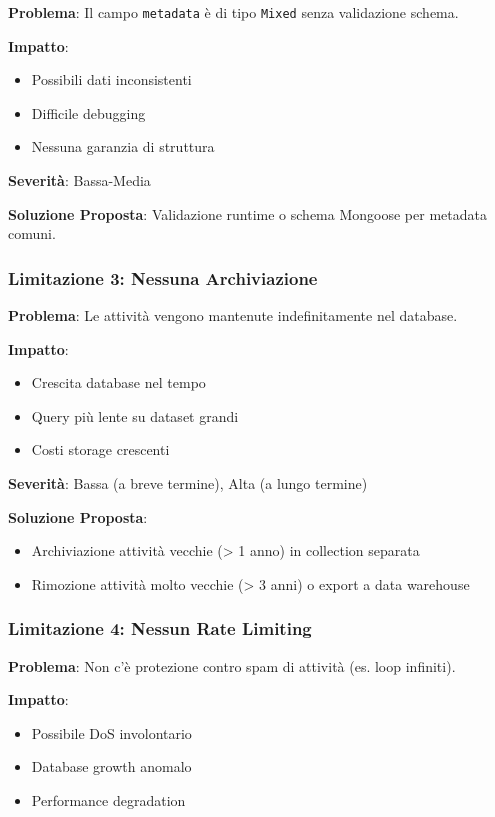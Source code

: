 \documentclass[11pt,a4paper]{article}
\begin{document}
\textbf{Problema}: Il campo \texttt{metadata} è di tipo \texttt{Mixed} senza validazione schema.

\textbf{Impatto}: 
\begin{itemize}
    \item Possibili dati inconsistenti
    \item Difficile debugging
    \item Nessuna garanzia di struttura
\end{itemize}

\textbf{Severità}: Bassa-Media

\textbf{Soluzione Proposta}: Validazione runtime o schema Mongoose per metadata comuni.

\subsubsection{Limitazione 3: Nessuna Archiviazione}

\textbf{Problema}: Le attività vengono mantenute indefinitamente nel database.

\textbf{Impatto}: 
\begin{itemize}
    \item Crescita database nel tempo
    \item Query più lente su dataset grandi
    \item Costi storage crescenti
\end{itemize}

\textbf{Severità}: Bassa (a breve termine), Alta (a lungo termine)

\textbf{Soluzione Proposta}: 
\begin{itemize}
    \item Archiviazione attività vecchie (> 1 anno) in collection separata
    \item Rimozione attività molto vecchie (> 3 anni) o export a data warehouse
\end{itemize}

\subsubsection{Limitazione 4: Nessun Rate Limiting}

\textbf{Problema}: Non c'è protezione contro spam di attività (es. loop infiniti).

\textbf{Impatto}: 
\begin{itemize}
    \item Possibile DoS involontario
    \item Database growth anomalo
    \item Performance degradation
\end{itemize}
\end{document}
